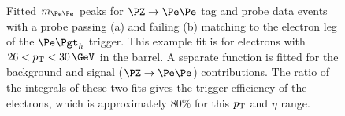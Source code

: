 \begin{figure}[htb]
\caption[Fitted $m_{ee}$ peaks for $\PZ\to\Pe\Pe$ tag and probe data events with
a probe passing or failing matching to the electron leg of the $\etau$ trigger.]
{Fitted $m_{\Pe\Pe}$ peaks for $\PZ\to\Pe\Pe$ tag and probe data events with a probe passing (a) and
failing (b) matching to the electron leg of the $\etau$ trigger. This example
fit is for electrons with $26 <\pt< 30\,\GeV$ in the barrel. A separate function is fitted for the
background and signal ($\PZ\to\Pe\Pe$) contributions. The ratio of the integrals
of these two fits gives the trigger efficiency of the electrons, which is
approximately $80\%$ for this $p_{\mathrm{T}}$ and $\eta$ range.}
\label{fig:tandp}
\end{figure}


